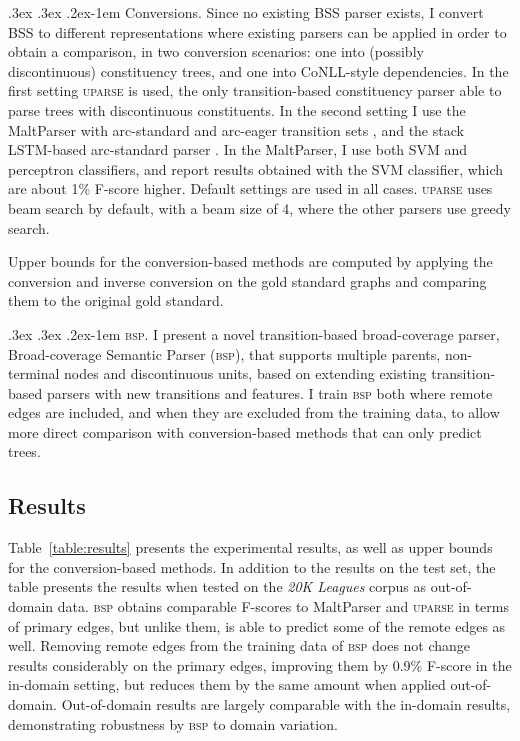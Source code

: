 \documentclass[12pt]{article}
\makeatletter
\newcommand{\tabref}[1]{Table~\ref{#1}}
\renewcommand{\paragraph}{
  \@startsection{paragraph}{4}
  {\z@}{.3ex \@plus .3ex \@minus .2ex}{-1em}
  {\normalfont\normalsize\bfseries}
}
\makeatother
\begin{document}
\paragraph{Conversions.}
Since no existing BSS parser exists, I convert BSS to different representations where
existing parsers can be applied in order to obtain a comparison, in
two conversion scenarios: one into (possibly discontinuous) constituency trees,
and one into CoNLL-style dependencies. In the first setting \textsc{uparse} is used,
the only transition-based constituency parser able to parse trees with
discontinuous constituents.
In the second setting I use the MaltParser with arc-standard and
arc-eager transition sets \cite{nivre2007maltparser},
and the stack LSTM-based arc-standard parser \cite{dyer2015transition}.
In the MaltParser, I use both SVM and perceptron classifiers, and report
results obtained with the SVM classifier, which are about 1\% F-score higher.
Default settings are used in all cases.
\textsc{uparse} uses beam search by default,
with a beam size of 4, where the other parsers use greedy search.

Upper bounds for the conversion-based methods are computed by applying
the conversion and inverse conversion on the gold standard
graphs and comparing them to the original gold standard.

\paragraph{\textsc{bsp}.}
I present a novel transition-based broad-coverage parser,
Broad-coverage Semantic Parser (\textsc{bsp}), that supports multiple parents,
non-terminal nodes and discontinuous units, based on extending existing
transition-based parsers with new transitions and features.
I train \textsc{bsp} both where remote edges
are included, and when they are excluded from the training data, to allow
more direct comparison with conversion-based methods that can only
predict trees.


\subsection{Results}\label{sec:results}

\tabref{table:results} presents the experimental results, as well as
upper bounds for the conversion-based methods.
In addition to the results on the test set,
the table presents the results when tested on the \textit{20K Leagues} corpus as out-of-domain data.
\textsc{bsp} obtains comparable F-scores to MaltParser and \textsc{uparse}
in terms of primary edges, but unlike them, is able to predict some
of the remote edges as well. 
Removing remote edges from the training data of \textsc{bsp} does not
change results considerably on the primary edges,
improving them by 0.9\% F-score in the in-domain setting, but reduces
them by the same amount when applied out-of-domain. 
Out-of-domain results are largely comparable with the in-domain
results, demonstrating robustness by \textsc{bsp}
to domain variation.
\end{document}
